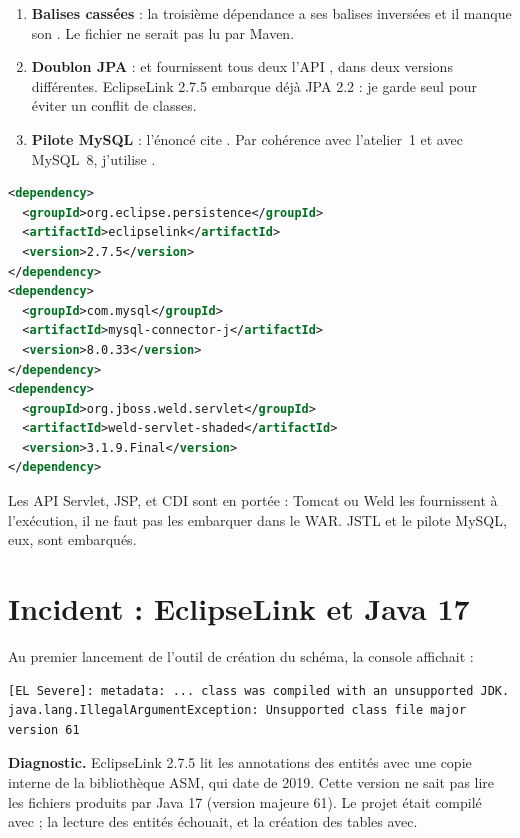 \begin{enumerate}
  \item \textbf{Balises cassées} : la troisième dépendance a ses balises inversées et il manque son
        . Le fichier ne serait pas lu par Maven.
  \item \textbf{Doublon JPA} :  et 
        fournissent tous deux l'API , dans deux versions différentes. EclipseLink 2.7.5
        embarque déjà JPA 2.2 : je garde  seul pour éviter un conflit de classes.
  \item \textbf{Pilote MySQL} : l'énoncé cite . Par cohérence avec l'atelier~1
        et avec MySQL~8, j'utilise .
\end{enumerate}

\begin{lstlisting}[language=XML,caption={Dépendances principales du pom.xml (extrait)}]
<dependency>
  <groupId>org.eclipse.persistence</groupId>
  <artifactId>eclipselink</artifactId>
  <version>2.7.5</version>
</dependency>
<dependency>
  <groupId>com.mysql</groupId>
  <artifactId>mysql-connector-j</artifactId>
  <version>8.0.33</version>
</dependency>
<dependency>
  <groupId>org.jboss.weld.servlet</groupId>
  <artifactId>weld-servlet-shaded</artifactId>
  <version>3.1.9.Final</version>
</dependency>
\end{lstlisting}

Les API Servlet, JSP,  et CDI sont en portée  : Tomcat ou Weld les fournissent
à l'exécution, il ne faut pas les embarquer dans le WAR. JSTL et le pilote MySQL, eux, sont embarqués.

\section{Incident : EclipseLink et Java 17}\label{sec:asm}
Au premier lancement de l'outil de création du schéma, la console affichait :

\begin{lstlisting}[basicstyle=\ttfamily\scriptsize]
[EL Severe]: metadata: ... class was compiled with an unsupported JDK.
java.lang.IllegalArgumentException: Unsupported class file major version 61
\end{lstlisting}

\textbf{Diagnostic.} EclipseLink 2.7.5 lit les annotations des entités avec une copie interne de la bibliothèque
ASM, qui date de 2019. Cette version ne sait pas lire les fichiers  produits par Java 17 (version
majeure 61). Le projet était compilé avec  ; la lecture des entités échouait, et la création des
tables avec.

